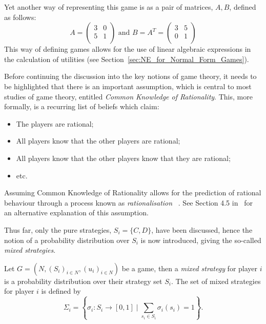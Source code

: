 Yet another way of representing this game is as a pair of matrices, \(A, B\),
defined as follows:
\begin{equation}
    A = 
    \begin{pmatrix}
       3 & 0\\
       5 & 1\\ 
    \end{pmatrix}
    \text{ and } B = A^{T} =
    \begin{pmatrix}
        3 & 5\\
        0 & 1\\
    \end{pmatrix}
\end{equation}
This way of defining games allows for the use of linear algebraic expressions in
the calculation of utilities (see Section~\ref{sec:NE_for_Normal_Form_Games}).

Before continuing the discussion into the key notions of game theory, it needs
to be highlighted that there is an important assumption, which is central to
most studies of game theory, entitled \textit{Common Knowledge of Rationality}.
This, more formally, is a recurring list of beliefs which claim:
    \begin{itemize}
        \item The players are rational;
        \item All players know that the other players are rational;
        \item All players know that the other players know that they are 
        rational; 
        \item etc.    
    \end{itemize}
Assuming Common Knowledge of Rationality allows for the prediction of rational
behaviour through a process known as \textit{rationalisation}
~\cite{Knight2019}. See Section 4.5 in~\cite{maschler_solan_zamir_2013} for an
alternative explanation of this assumption. 

Thus far, only the pure strategies, \(S_{i}=\{C, D\} \), have
been discussed, hence the notion of a probability distribution over \(S_{i}\) is
now introduced, giving the so-called \textit{mixed strategies}.

\begin{definition}
   Let \(G=(N, {(S_{i})}_{i \in N}, {(u_{i})}_{i \in N})\) be a game, then a \textit{mixed strategy} for player \(i\) is a
probability distribution over their strategy set \(S_{i}\). The set of mixed
strategies for player \(i\) is defined by 
\begin{equation}
    \Sigma_{i} = \left \{ \sigma_{i} : S_{i} \to [0, 1] \mid \sum_{s_{i} \in S_{i}}{\sigma_
{i}(s_{i})} = 1 \right \}. 
\end{equation}
\end{definition}

